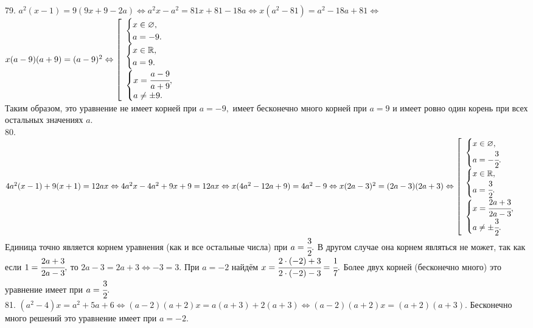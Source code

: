 \documentclass[12pt]{article}
\begin{document}
79. $a^2(x-1)=9(9x+9-2a)\Leftrightarrow a^2x-a^2=81x+81-18a\Leftrightarrow x(a^2-81)=a^2-18a+81\Leftrightarrow$\\$
x(a-9)(a+9)=(a-9)^2\Leftrightarrow\left[\begin{array}{l}\begin{cases} x\in\varnothing,\\ a=-9.\end{cases}\\
\begin{cases} x\in\mathbb{R},\\ a=9.\end{cases}\\\begin{cases} x=\cfrac{a-9}{a+9},\\ a\neq\pm9.\end{cases}\end{array}\right.$\\
Таким образом, это уравнение не имеет корней при $a=-9,$ имеет бесконечно много корней при $a=9$ и имеет ровно один корень при всех остальных значениях $a.$\\
80. $4a^2(x-1)+9(x+1)=12ax\Leftrightarrow 4a^2x-4a^2+9x+9=12ax\Leftrightarrow
x(4a^2-12a+9)=4a^2-9\Leftrightarrow x(2a-3)^2=(2a-3)(2a+3)\Leftrightarrow
\left[\begin{array}{l}\begin{cases} x\in\varnothing,\\ a=-\cfrac{3}{2}.\end{cases}\\
\begin{cases} x\in\mathbb{R},\\ a=\cfrac{3}{2}.\end{cases}\\\begin{cases} x=\cfrac{2a+3}{2a-3},\\ a\neq\pm\cfrac{3}{2}.\end{cases}\end{array}\right.$\\
Единица точно является корнем уравнения (как и все остальные числа) при $a=\cfrac{3}{2}.$ В другом случае она корнем являться не может, так как если $1=\cfrac{2a+3}{2a-3},$ то $2a-3=2a+3\Leftrightarrow -3=3.$ При $a=-2$ найдём $x=\cfrac{2\cdot(-2)+3}{2\cdot(-2)-3}=\cfrac{1}{7}.$ Более двух корней (бесконечно много) это уравнение имеет при $a=\cfrac{3}{2}.$\\
81. $(a^2-4)x=a^2+5a+6\Leftrightarrow (a-2)(a+2)x=a(a+3)+2(a+3)\Leftrightarrow(a-2)(a+2)x=(a+2)(a+3).$ Бесконечно много решений это уравнение имеет при $a=-2.$\\
\end{document}
